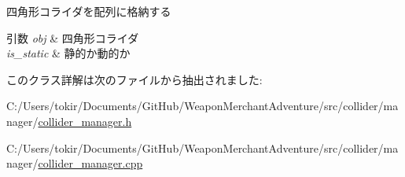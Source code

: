 四角形コライダを配列に格納する 


\begin{DoxyParams}{引数}
{\em obj} & 四角形コライダ \\
\hline
{\em is\+\_\+static} & 静的か動的か \\
\hline
\end{DoxyParams}


このクラス詳解は次のファイルから抽出されました\+:\begin{DoxyCompactItemize}
\item 
C\+:/\+Users/tokir/\+Documents/\+Git\+Hub/\+Weapon\+Merchant\+Adventure/src/collider/manager/\mbox{\hyperlink{collider__manager_8h}{collider\+\_\+manager.\+h}}\item 
C\+:/\+Users/tokir/\+Documents/\+Git\+Hub/\+Weapon\+Merchant\+Adventure/src/collider/manager/\mbox{\hyperlink{collider__manager_8cpp}{collider\+\_\+manager.\+cpp}}\end{DoxyCompactItemize}
